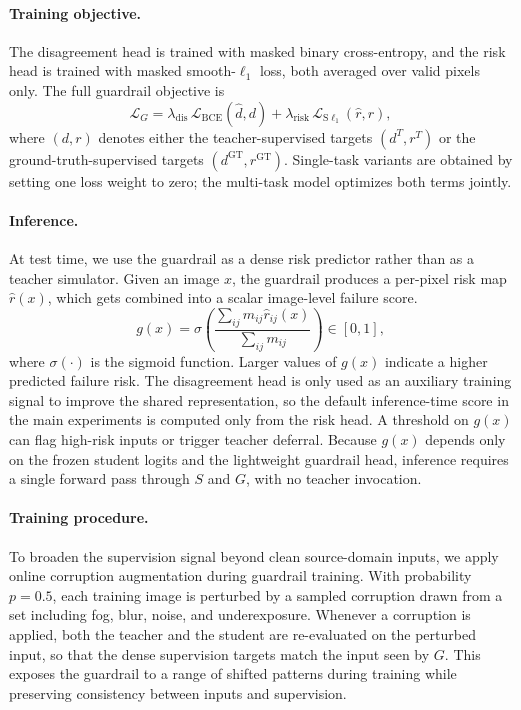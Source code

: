 \documentclass{article}
\begin{document}
\paragraph{Training objective.}
The disagreement head is trained with masked binary cross-entropy, and the risk head is trained with masked smooth-$\ell_1$ loss, both averaged over valid pixels only. The full guardrail objective is
\[
\mathcal{L}_{G}
=
\lambda_{\mathrm{dis}} \, \mathcal{L}_{\mathrm{BCE}}(\hat d, d)
+
\lambda_{\mathrm{risk}} \, \mathcal{L}_{\mathrm{S\ell_1}}(\hat r, r),
\]
where $(d,r)$ denotes either the teacher-supervised targets $(d^{T}, r^{T})$ or the ground-truth-supervised targets $(d^{\mathrm{GT}}, r^{\mathrm{GT}})$. Single-task variants are obtained by setting one loss weight to zero; the multi-task model optimizes both terms jointly.


\paragraph{Inference.}
At test time, we use the guardrail as a dense risk predictor rather than as a teacher simulator. Given an image $x$, the guardrail produces a per-pixel risk map $\hat r(x)$, which gets combined into a scalar image-level failure score.
\[
g(x)
=
\sigma\!\left(
\frac{\sum_{ij} m_{ij} \hat r_{ij}(x)}
   {\sum_{ij} m_{ij}}
\right)
\in [0,1],
\]
where $\sigma(\cdot)$ is the sigmoid function. Larger values of $g(x)$ indicate a higher predicted failure risk. The disagreement head is only used as an auxiliary training signal to improve the shared representation, so the default inference-time score in the main experiments is computed only from the risk head. A threshold on $g(x)$ can flag high-risk inputs or trigger teacher deferral. Because $g(x)$ depends only on the frozen student logits and the lightweight guardrail head, inference requires a single forward pass through $S$ and $G$, with no teacher invocation.


\paragraph{Training procedure.}
To broaden the supervision signal beyond clean source-domain inputs, we apply online corruption augmentation during guardrail training. With probability $p=0.5$, each training image is perturbed by a sampled corruption drawn from a set including fog, blur, noise, and underexposure. Whenever a corruption is applied, both the teacher and the student are re-evaluated on the perturbed input, so that the dense supervision targets match the input seen by $G$. This exposes the guardrail to a range of shifted patterns during training while preserving consistency between inputs and supervision.
\end{document}
